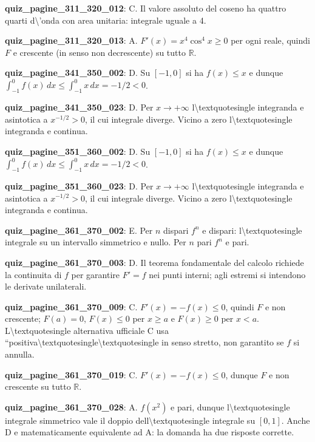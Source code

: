 \documentclass[11pt,a4paper]{article}
\newcounter{quiz}
\begin{document}
\noindent\textbf{quiz\_pagine\_311\_320\_012}: C. Il valore assoluto del coseno ha quattro quarti d\textbackslash{}'onda con area unitaria: integrale uguale a 4.\par\medskip
\noindent\textbf{quiz\_pagine\_311\_320\_013}: A. $F\prime(x)=x^4\cos^4x\geq0$ per ogni reale, quindi $F$ e crescente (in senso non decrescente) su tutto $\mathbb R$.\par\medskip
\noindent\textbf{quiz\_pagine\_341\_350\_002}: D. Su $[-1,0]$ si ha $f(x)\leq x$ e dunque $\int_{-1}^0f(x)\,dx\leq\int_{-1}^0x\,dx=-1/2<0$.\par\medskip
\noindent\textbf{quiz\_pagine\_341\_350\_023}: D. Per $x\to+\infty$ l\textbackslash{}textquotesingle integranda e asintotica a $x^{-1/2}>0$, il cui integrale diverge. Vicino a zero l\textbackslash{}textquotesingle integranda e continua.\par\medskip
\noindent\textbf{quiz\_pagine\_351\_360\_002}: D. Su $[-1,0]$ si ha $f(x)\leq x$ e dunque $\int_{-1}^0f(x)\,dx\leq\int_{-1}^0x\,dx=-1/2<0$.\par\medskip
\noindent\textbf{quiz\_pagine\_351\_360\_023}: D. Per $x\to+\infty$ l\textbackslash{}textquotesingle integranda e asintotica a $x^{-1/2}>0$, il cui integrale diverge. Vicino a zero l\textbackslash{}textquotesingle integranda e continua.\par\medskip
\noindent\textbf{quiz\_pagine\_361\_370\_002}: E. Per $n$ dispari $f^n$ e dispari: l\textbackslash{}textquotesingle integrale su un intervallo simmetrico e nullo. Per $n$ pari $f^n$ e pari.\par\medskip
\noindent\textbf{quiz\_pagine\_361\_370\_003}: D. Il teorema fondamentale del calcolo richiede la continuita di $f$ per garantire $F\prime=f$ nei punti interni; agli estremi si intendono le derivate unilaterali.\par\medskip
\noindent\textbf{quiz\_pagine\_361\_370\_009}: C. $F\prime(x)=-f(x)\leq0$, quindi $F$ e non crescente; $F(a)=0$, $F(x)\leq0$ per $x\geq a$ e $F(x)\geq0$ per $x<a$. L\textbackslash{}textquotesingle alternativa ufficiale C usa ``positiva\textbackslash{}textquotesingle\textbackslash{}textquotesingle in senso stretto, non garantito se $f$ si annulla.\par\medskip
\noindent\textbf{quiz\_pagine\_361\_370\_019}: C. $F\prime(x)=-f(x)\leq0$, dunque $F$ e non crescente su tutto $\mathbb R$.\par\medskip
\noindent\textbf{quiz\_pagine\_361\_370\_028}: A. $f(x^2)$ e pari, dunque l\textbackslash{}textquotesingle integrale simmetrico vale il doppio dell\textbackslash{}textquotesingle integrale su $[0,1]$. Anche D e matematicamente equivalente ad A: la domanda ha due risposte corrette.\par\medskip
\end{document}
